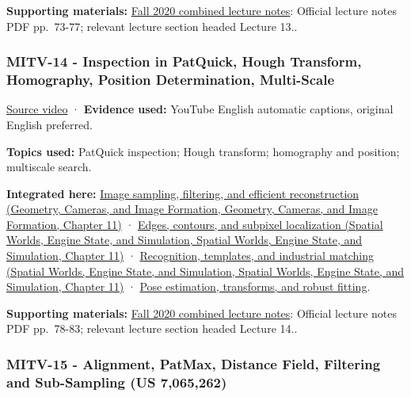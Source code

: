 \textbf{Supporting materials:} \href{https://ocw.mit.edu/courses/6-801-machine-vision-fall-2020/9ec44f69e72995c370b3797818ba01e6_MIT6_801F20_lectureNotes.pdf}{Fall 2020 combined lecture notes}: Official lecture notes PDF pp.~73-77; relevant lecture section headed Lecture 13..

\subsubsection{MITV-14 - Inspection in PatQuick, Hough Transform, Homography, Position Determination, Multi-Scale}\label{04-visual-computing-ii-ch036-mitv-14---inspection-in-patquick-hough-transform-homography-position-determination-multi-scale}

\href{https://www.youtube.com/watch?v=6SvDRpQeZrA}{Source video} · \textbf{Evidence used:} YouTube English automatic captions, original English preferred.

\textbf{Topics used:} PatQuick inspection; Hough transform; homography and position; multiscale search.

\textbf{Integrated here:} \href{../03-Geometry-Cameras-and-Image-Formation/main.pdf\#nameddest=03-visual-computing-i-ch004-image-sampling-filtering-and-efficient-reconstruction}{Image sampling, filtering, and efficient reconstruction (Geometry, Cameras, and Image Formation, Geometry, Cameras, and Image Formation, Chapter 11)} · \href{../05-Spatial-Worlds-Engine-State-and-Simulation/main.pdf\#nameddest=04-visual-computing-ii-ch030-edges-contours-and-subpixel-localization}{Edges, contours, and subpixel localization (Spatial Worlds, Engine State, and Simulation, Spatial Worlds, Engine State, and Simulation, Chapter 11)} · \href{../05-Spatial-Worlds-Engine-State-and-Simulation/main.pdf\#nameddest=04-visual-computing-ii-ch030-recognition-templates-and-industrial-matching}{Recognition, templates, and industrial matching (Spatial Worlds, Engine State, and Simulation, Spatial Worlds, Engine State, and Simulation, Chapter 11)} · \hyperref[04-visual-computing-ii-ch032-pose-estimation-transforms-and-robust-fitting]{Pose estimation, transforms, and robust fitting}.

\textbf{Supporting materials:} \href{https://ocw.mit.edu/courses/6-801-machine-vision-fall-2020/9ec44f69e72995c370b3797818ba01e6_MIT6_801F20_lectureNotes.pdf}{Fall 2020 combined lecture notes}: Official lecture notes PDF pp.~78-83; relevant lecture section headed Lecture 14..

\subsubsection{MITV-15 - Alignment, PatMax, Distance Field, Filtering and Sub-Sampling (US 7,065,262)}\label{04-visual-computing-ii-ch036-mitv-15---alignment-patmax-distance-field-filtering-and-sub-sampling-us-7065262}

